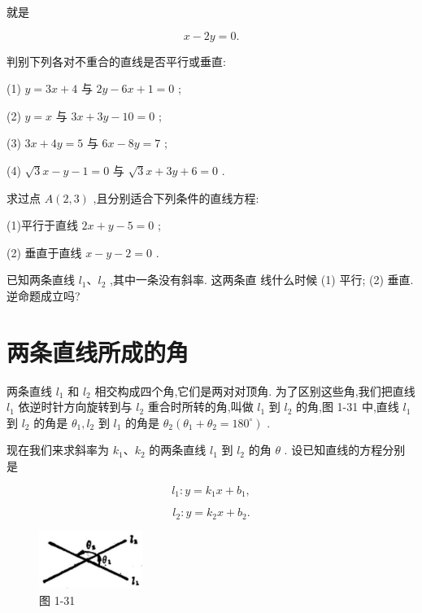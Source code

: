 \documentclass[lang=cn,newtx,10pt,scheme=chinese]{elegantbook}
\begin{document}
就是

\[
  x - {2y} = 0.
\]

\begin{problemset}[练习]

\item 判别下列各对不重合的直线是否平行或垂直:

(1) \(y = {3x} + 4\) 与 \({2y} - {6x} + 1 = 0\) ;

(2) \(y = x\) 与 \({3x} + {3y} - {10} = 0\) ;

(3) \({3x} + {4y} = 5\) 与 \({6x} - {8y} = 7\) ;

(4) \(\sqrt{3}x - y - 1 = 0\) 与 \(\sqrt{3}x + {3y} + 6 = 0\) .

\item 求过点 \(A\left( {2,3}\right)\) ,且分别适合下列条件的直线方程:

(1)平行于直线 \({2x} + y - 5 = 0\) ;

(2) 垂直于直线 \(x - y - 2 = 0\) .

\item 已知两条直线 \({l}_{1}\text{、}{l}_{2}\) ,其中一条没有斜率. 这两条直 线什么时候 (1) 平行; (2) 垂直. 逆命题成立吗?
\end{problemset}

\section{两条直线所成的角}

两条直线 \({l}_{1}\) 和 \({l}_{2}\) 相交构成四个角,它们是两对对顶角. 为了区别这些角,我们把直线 \({l}_{1}\) 依逆时针方向旋转到与 \({l}_{2}\) 重合时所转的角,叫做 \({l}_{1}\) 到 \({l}_{2}\) 的角,图 1-31 中,直线 \({l}_{1}\) 到 \({l}_{2}\) 的角是 \({\theta }_{1},{l}_{2}\) 到 \({l}_{1}\) 的角是 \({\theta }_{2}\left( {{\theta }_{1} + {\theta }_{2} = {180}^{ \circ }}\right)\) .

现在我们来求斜率为 \({k}_{1}\text{、}{k}_{2}\) 的两条直线 \({l}_{1}\) 到 \({l}_{2}\) 的角 \(\theta\) . 设已知直线的方程分别是

\[
    {l}_{1} : y = {k}_{1}x + {b}_{1},
\]

\[
    {l}_{2} : y = {k}_{2}x + {b}_{2}.
\]

\begin{figure}[h]
  \centering
  \includegraphics[max width=0.3\textwidth]{images/01912cc2-ffb6-728e-9ae7-b113ff05c64b_46_107087.jpg}
  \caption{图 1-31}
\end{figure}
\end{document}

